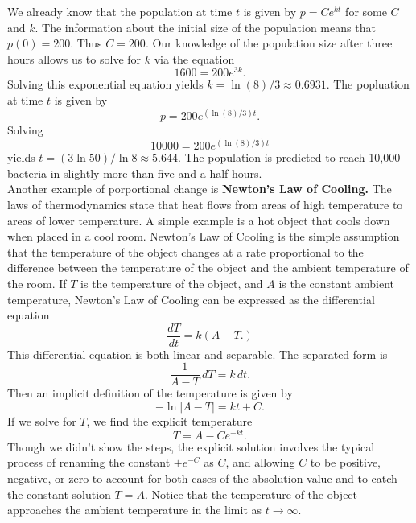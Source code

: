 {We already know that the population at time $t$ is given by $p = Ce^{kt}$ for some $C$ and $k$.  The information about the initial size of the population means that $p(0)=200.$ Thus $C=200.$  Our knowledge of the population size after three hours allows us to solve for $k$ via the equation
	\[
		1600 = 200e^{3k}.
	\]
Solving this exponential equation yields $k =\ln(8)/3 \approx 0.6931.$  The popluation at time $t$ is given by
	\[
		p = 200 e^{(\ln(8)/3)t}.
	\]
Solving
	\[
		10000 = 200e^{(\ln(8)/3)t}
	\]
yields $t =(3\ln 50)/\ln 8 \approx 5.644.$  The population is predicted to reach 10,000 bacteria in slightly more than five and a half hours.
}\\

Another example of porportional change is \textbf{Newton's Law of Cooling.} The laws of thermodynamics state that heat flows from areas of high temperature to areas of lower temperature.  A simple example is a hot object that cools down when placed in a cool room.  Newton's Law of Cooling is the simple assumption that the temperature of the object changes at a rate proportional to the difference between the temperature of the object and the ambient temperature of the room.  If $T$ is the temperature of the object, and $A$ is the constant ambient temperature, Newton's Law of Cooling can be expressed as the differential equation
	\[
		\frac{dT}{dt} = k(A - T.)
	\]
This differential equation is both linear and separable. The separated form is
	\[
		\frac{1}{A-T}\,dT = k\,dt.
	\]
Then an implicit definition of the temperature is given by
	\[
		-\ln|A-T| = kt + C.
	\]
If we solve for $T$, we find the explicit temperature
	\[
		T = A-Ce^{-kt}.
	\]
Though we didn't show the steps, the explicit solution involves the typical process of renaming the constant $\pm e^{-C}$ as $C$, and allowing $C$ to be positive, negative, or zero to account for both cases of the absolution value and to catch the constant solution $T=A.$ Notice that the temperature of the object approaches the ambient temperature in the limit as $t\to\infty$.


